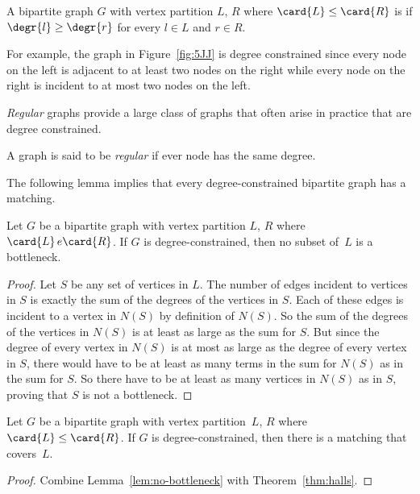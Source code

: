 \begin{definition}\label{degree-constrained_def}
A bipartite graph $G$ with vertex partition $L$, $R$ where $\card{L}
\le \card{R}$ is  if $\degr{l} \geq \degr{r}$
for every $l \in L$ and $r \in R$.
\end{definition}

For example, the graph in Figure~\ref{fig:5JJ} is degree constrained
since every node on the left is adjacent to at least two nodes on the
right while every node on the right is incident to at most two nodes
on the left.

\emph{Regular} graphs provide a large class of graphs that often arise
in practice that are degree constrained.

\begin{definition}\label{def:5P}
A graph is said to be \emph{regular} if ever node has the same degree.
\end{definition}

The following lemma implies that every degree-constrained bipartite
graph has a matching.

\begin{lemma}\label{lem:no-bottleneck}
Let $G$ be a bipartite graph with vertex partition $L$, $R$ where
$\card{L} \,e \card{R}$.  If $G$ is degree-constrained, then no subset
of~$L$ is a bottleneck.
\end{lemma}

\begin{proof}
Let $S$ be any set of vertices in $L$.  The number of edges incident
to vertices in $S$ is exactly the sum of the degrees of the vertices
in $S$.  Each of these edges is incident to a vertex in $N(S)$ by
definition of $N(S)$.  So the sum of the degrees of the vertices in
$N(S)$ is at least as large as the sum for $S$.  But since the degree
of every vertex in $N(S)$ is at most as large as the degree of every
vertex in $S$, there would have to be at least as many terms in the
sum for $N(S)$ as in the sum for $S$.  So there have to be at least as
many vertices in $N(S)$ as in $S$, proving that $S$ is not a
bottleneck.
\end{proof}

\begin{corollary}\label{cor:5L}
Let $G$ be a bipartite graph with vertex partition~$L$, $R$ where
$\card{L} \leq \card{R}$.  If $G$ is degree-constrained, then there is
a matching that covers~$L$.
\end{corollary}

\begin{proof}
Combine Lemma~\ref{lem:no-bottleneck} with Theorem~\ref{thm:halls}.
\end{proof}

